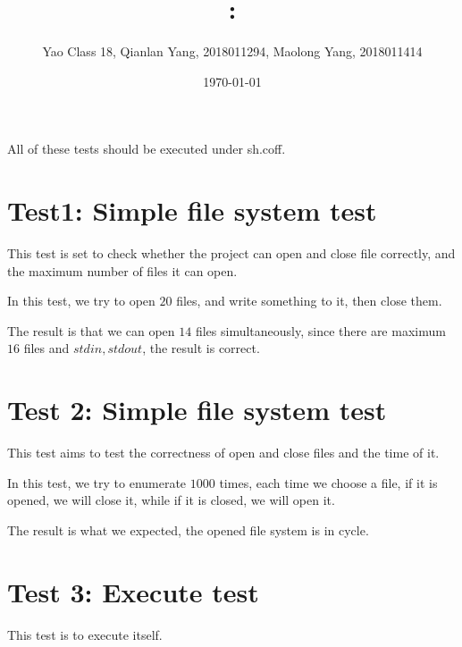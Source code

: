 \documentclass[11pt]{article}
\title{\textmd{\bf \Class: \Title}}
\date{\today}
\author{Yao Class 18, Qianlan Yang, 2018011294, Maolong Yang, 2018011414}
\begin{document}
\begin{spacing}{1.1}
\maketitle \thispagestyle{empty}







\iffalse

\begin{figure}[h]%
	\centering  %
	\texttt{[image: image.jpg]}  %
\end{figure}

\fi

All of these tests should be executed under sh.coff.

\section{Test1: Simple file system test}

This test is set to check whether the project can open and close file correctly, and the maximum number of files it can open.

In this test, we try to open $20$ files, and write something to it, then close them.

The result is that we can open $14$ files simultaneously, since there are maximum $16$ files and $stdin,stdout$, the result is correct. 


\section{Test 2: Simple file system test}

This test aims to test the correctness of open and close files and the time of it.

In this test, we try to enumerate $1000$ times, each time we choose a file, if it is opened, we will close it, while if it is closed, we will open it.

The result is what we expected, the opened file system is in cycle.

\section{Test 3: Execute test}

This test is to execute itself.


\end{spacing}
\end{document}
